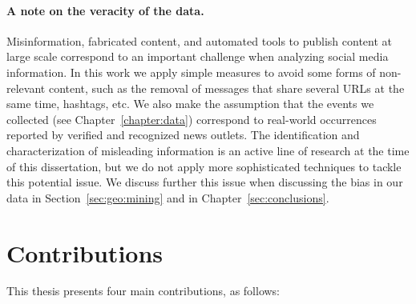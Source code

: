 \paragraph{A note on the veracity of the data.} 
%
Misinformation, fabricated content, and automated tools to publish content at
large scale correspond to an important challenge when analyzing social media
information.
%
In this work we apply simple measures to avoid some forms of non-relevant
content, such as the removal of messages that share several URLs at the same
time, hashtags, etc.
%
We also make the assumption that the events we collected (see
Chapter~\ref{chapter:data}) correspond to real-world occurrences reported by
verified and recognized news outlets.
%
The identification and characterization of misleading information is an active
line of research at the time of this dissertation, but we do not apply more
sophisticated techniques to tackle this potential issue.
%
We discuss further this issue when discussing the bias in our data in
Section~\ref{sec:geo:mining} and in Chapter~\ref{sec:conclusions}.



\section{Contributions} 

This thesis presents four main contributions, as follows:


